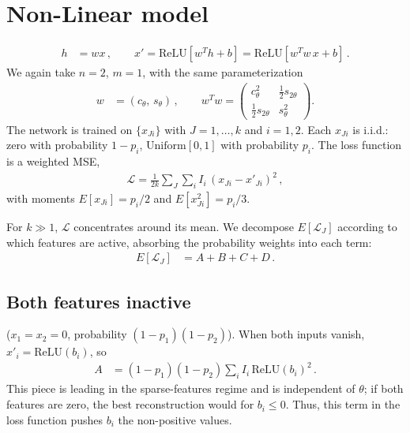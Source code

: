 \documentclass[a4paper]{article}
\begin{document}
\section{Non-Linear model}
\begin{align}
h &= w x\,, \qquad x' = \mathrm{ReLU}[w^T h + b] = \mathrm{ReLU}[w^T w\, x + b]\,.
\end{align}
We again take $n=2$, $m=1$, with the same parameterization
\begin{align}
w &= (c_\theta,\, s_\theta)\,, \qquad
w^T w = \begin{pmatrix} c^2_\theta & \tfrac{1}{2}s_{2\theta} \\ \tfrac{1}{2}s_{2\theta} & s^2_\theta \end{pmatrix}.
\end{align}
The network is trained on $\{x_{Ji}\}$ with $J=1,\ldots,k$ and $i=1,2$. Each $x_{Ji}$ is i.i.d.: zero with probability $1-p_i$, $\mathrm{Uniform}[0,1]$ with probability $p_i$. The loss function is a weighted MSE,
\begin{align}
\mathcal{L} = \frac{1}{2k}\sum_J\sum_i I_i\,(x_{Ji}-x'_{Ji})^2\,,
\end{align}
with moments $E[x_{Ji}]=p_i/2$ and $E[x_{Ji}^2]=p_i/3$.

For $k\gg 1$, $\mathcal{L}$ concentrates around its mean. We decompose $E[\mathcal{L}_J]$ according to which features are active, absorbing the probability weights into each term:
\begin{align}
E[\mathcal{L}_J] &= A + B + C + D\,.
\end{align}

\subsection{Both features inactive} ($x_1=x_2=0$, probability $(1-p_1)(1-p_2)$). When both inputs vanish, $x'_i = \mathrm{ReLU}(b_i)$, so
\begin{align}
A &= (1-p_1)(1-p_2)\sum_i I_i\,\mathrm{ReLU}(b_i)^2\,.
\end{align}
This piece is leading in the sparse-features regime and is independent of $\theta$; if both features are zero, the best reconstruction would for $b_i\leq0$. Thus, this term in the loss function pushes $b_i$ the non-positive values.
\end{document}
